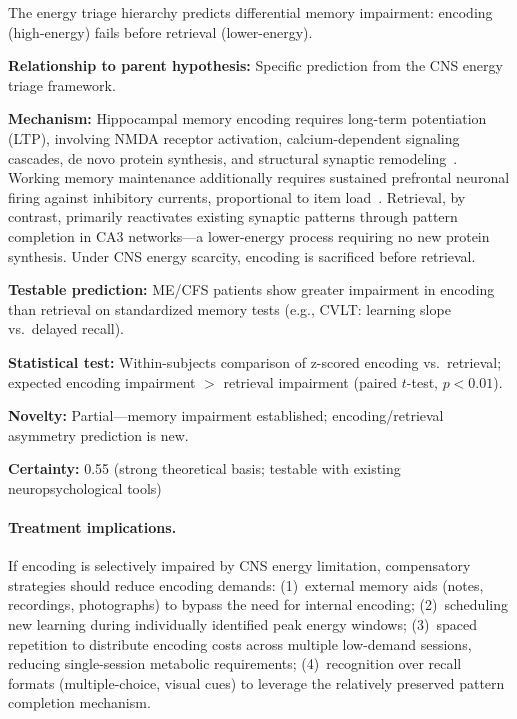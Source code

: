 \begin{hypothesis}
\label{hyp:memory-triage}
The energy triage hierarchy predicts differential memory impairment: encoding (high-energy) fails before retrieval (lower-energy).

\textbf{Relationship to parent hypothesis:} Specific prediction from the CNS energy triage framework.

\textbf{Mechanism:} Hippocampal memory encoding requires long-term potentiation (LTP), involving NMDA receptor activation, calcium-dependent signaling cascades, de novo protein synthesis, and structural synaptic remodeling~\cite{Kandel2014memory,Dudai2015consolidation}. Working memory maintenance additionally requires sustained prefrontal neuronal firing against inhibitory currents, proportional to item load~\cite{Constantinidis2018working}. Retrieval, by contrast, primarily reactivates existing synaptic patterns through pattern completion in CA3 networks---a lower-energy process requiring no new protein synthesis. Under CNS energy scarcity, encoding is sacrificed before retrieval.

\textbf{Testable prediction:} ME/CFS patients show greater impairment in encoding than retrieval on standardized memory tests (e.g., CVLT: learning slope vs.\ delayed recall).

\textbf{Statistical test:} Within-subjects comparison of z-scored encoding vs.\ retrieval; expected encoding impairment $>$ retrieval impairment (paired $t$-test, $p < 0.01$).

\textbf{Novelty:} Partial---memory impairment established; encoding/retrieval asymmetry prediction is new.

\textbf{Certainty:} 0.55 (strong theoretical basis; testable with existing neuropsychological tools)

\paragraph{Treatment implications.}
If encoding is selectively impaired by CNS energy limitation, compensatory strategies should reduce encoding demands: (1)~external memory aids (notes, recordings, photographs) to bypass the need for internal encoding; (2)~scheduling new learning during individually identified peak energy windows; (3)~spaced repetition to distribute encoding costs across multiple low-demand sessions, reducing single-session metabolic requirements; (4)~recognition over recall formats (multiple-choice, visual cues) to leverage the relatively preserved pattern completion mechanism.


\end{hypothesis}
